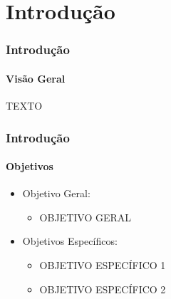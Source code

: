 



\section{Introdução}

\begin{frame}
    \frametitle{Introdução}
    \framesubtitle{Visão Geral}
    \center

        TEXTO
        
\end{frame}


\begin{frame}
    \frametitle{Introdução}
    \framesubtitle{Objetivos}
    \begin{itemize}
        
        \item Objetivo Geral:
        \begin{itemize}
        
            \item OBJETIVO GERAL

        \end{itemize}
        
        \item Objetivos Específicos:
        \begin{itemize}

            \item OBJETIVO ESPECÍFICO 1
            \item OBJETIVO ESPECÍFICO 2

        \end{itemize}
        
    \end{itemize}
\end{frame}

